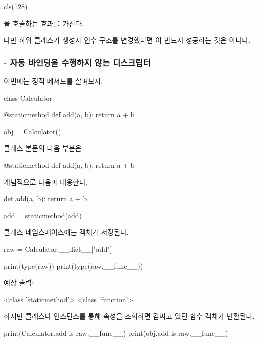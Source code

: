 \begin{dhkcode}
cls(128)
\end{dhkcode}

을 호출하는 효과를 가진다.

다만 하위 클래스가 생성자 인수 구조를 변경했다면 이 반드시 성공하는 것은 아니다.

\subsubsection{ - 자동 바인딩을 수행하지 않는 디스크립터}

이번에는 정적 메서드를 살펴보자.

\begin{dhkcode}
class Calculator:

    @staticmethod
    def add(a, b):
        return a + b


obj = Calculator()
\end{dhkcode}

클래스 본문의 다음 부분은

\begin{dhkcode}
@staticmethod
def add(a, b):
    return a + b
\end{dhkcode}

개념적으로 다음과 대응한다.

\begin{dhkcode}
def add(a, b):
    return a + b

add = staticmethod(add)
\end{dhkcode}

클래스 네임스페이스에는  객체가 저장된다.

\begin{dhkcode}
raw = Calculator.__dict__["add"]

print(type(raw))
print(type(raw.__func__))
\end{dhkcode}

예상 출력:

\begin{dhkzsh}
<class 'staticmethod'>
<class 'function'>
\end{dhkzsh}

하지만 클래스나 인스턴스를 통해 속성을 조회하면 감싸고 있던 함수 객체가 반환된다.

\begin{dhkcode}
print(Calculator.add is raw.__func__)
print(obj.add is raw.__func__)
\end{dhkcode}

